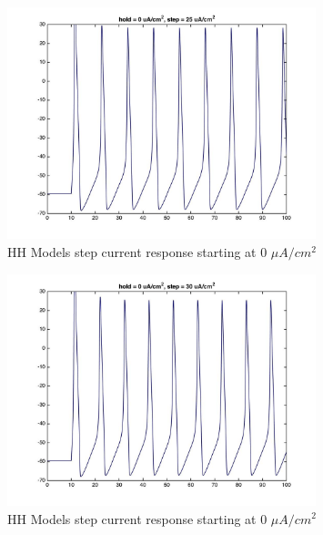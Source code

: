 \documentclass{beamer}
\begin{document}
\begin{frame}
  \begin{figure}
    \centering
    \includegraphics[width = 0.8\textwidth]{./images/current_0_25.jpg}
    \caption{HH Models step current response starting at 0 $\mu A/cm^2$}
  \end{figure}
\end{frame}


\begin{frame}
  \begin{figure}
    \centering
    \includegraphics[width = 0.8\textwidth]{./images/current_0_30.jpg}
    \caption{HH Models step current response starting at 0 $\mu A/cm^2$}
  \end{figure}
\end{frame}
\end{document}
